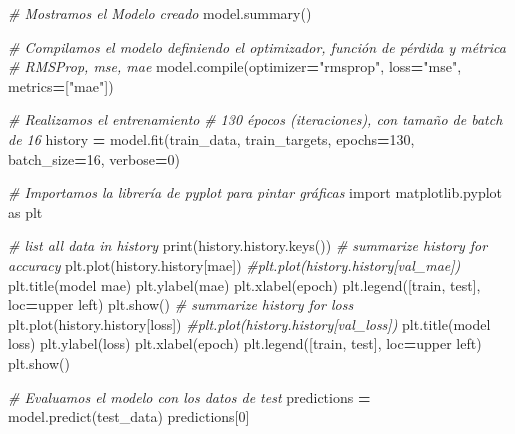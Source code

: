 \documentclass[
  a4paper,
  DIV=11,
  numbers=noendperiod]{scrreprt}
\newenvironment{Shaded}{\begin{snugshade}}{\end{snugshade}}
\newcommand{\BuiltInTok}[1]{#1}
\newcommand{\CommentTok}[1]{\textcolor[rgb]{0.56,0.35,0.01}{\textit{#1}}}
\newcommand{\DecValTok}[1]{\textcolor[rgb]{0.00,0.00,0.81}{#1}}
\newcommand{\ImportTok}[1]{#1}
\newcommand{\NormalTok}[1]{#1}
\newcommand{\OperatorTok}[1]{\textcolor[rgb]{0.81,0.36,0.00}{\textbf{#1}}}
\newcommand{\StringTok}[1]{\textcolor[rgb]{0.31,0.60,0.02}{#1}}
\begin{document}
\begin{Shaded}
\begin{Highlighting}[numbers=left,,]
\CommentTok{\# Mostramos el Modelo creado}
\NormalTok{model.summary()}

\CommentTok{\# Compilamos el modelo definiendo el optimizador, función de pérdida y métrica}
\CommentTok{\# RMSProp, mse, mae}
\NormalTok{model.}\BuiltInTok{compile}\NormalTok{(optimizer}\OperatorTok{=}\StringTok{"rmsprop"}\NormalTok{, loss}\OperatorTok{=}\StringTok{"mse"}\NormalTok{, metrics}\OperatorTok{=}\NormalTok{[}\StringTok{"mae"}\NormalTok{])}



\CommentTok{\# Realizamos el entrenamiento}
\CommentTok{\# 130 épocos (iteraciones), con tamaño de batch de 16}
\NormalTok{history }\OperatorTok{=}\NormalTok{ model.fit(train\_data, train\_targets,}
\NormalTok{          epochs}\OperatorTok{=}\DecValTok{130}\NormalTok{, batch\_size}\OperatorTok{=}\DecValTok{16}\NormalTok{, verbose}\OperatorTok{=}\DecValTok{0}\NormalTok{)}


\CommentTok{\# Importamos la librería de pyplot para pintar gráficas}
\ImportTok{import}\NormalTok{ matplotlib.pyplot }\ImportTok{as}\NormalTok{ plt}

\CommentTok{\# list all data in history}
\BuiltInTok{print}\NormalTok{(history.history.keys())}
\CommentTok{\# summarize history for accuracy}
\NormalTok{plt.plot(history.history[}\StringTok{\textquotesingle{}mae\textquotesingle{}}\NormalTok{])}
\CommentTok{\#plt.plot(history.history[\textquotesingle{}val\_mae\textquotesingle{}])}
\NormalTok{plt.title(}\StringTok{\textquotesingle{}model mae\textquotesingle{}}\NormalTok{)}
\NormalTok{plt.ylabel(}\StringTok{\textquotesingle{}mae\textquotesingle{}}\NormalTok{)}
\NormalTok{plt.xlabel(}\StringTok{\textquotesingle{}epoch\textquotesingle{}}\NormalTok{)}
\NormalTok{plt.legend([}\StringTok{\textquotesingle{}train\textquotesingle{}}\NormalTok{, }\StringTok{\textquotesingle{}test\textquotesingle{}}\NormalTok{], loc}\OperatorTok{=}\StringTok{\textquotesingle{}upper left\textquotesingle{}}\NormalTok{)}
\NormalTok{plt.show()}
\CommentTok{\# summarize history for loss}
\NormalTok{plt.plot(history.history[}\StringTok{\textquotesingle{}loss\textquotesingle{}}\NormalTok{])}
\CommentTok{\#plt.plot(history.history[\textquotesingle{}val\_loss\textquotesingle{}])}
\NormalTok{plt.title(}\StringTok{\textquotesingle{}model loss\textquotesingle{}}\NormalTok{)}
\NormalTok{plt.ylabel(}\StringTok{\textquotesingle{}loss\textquotesingle{}}\NormalTok{)}
\NormalTok{plt.xlabel(}\StringTok{\textquotesingle{}epoch\textquotesingle{}}\NormalTok{)}
\NormalTok{plt.legend([}\StringTok{\textquotesingle{}train\textquotesingle{}}\NormalTok{, }\StringTok{\textquotesingle{}test\textquotesingle{}}\NormalTok{], loc}\OperatorTok{=}\StringTok{\textquotesingle{}upper left\textquotesingle{}}\NormalTok{)}
\NormalTok{plt.show()}


\CommentTok{\# Evaluamos el modelo con los datos de test}
\NormalTok{predictions }\OperatorTok{=}\NormalTok{ model.predict(test\_data)}
\NormalTok{predictions[}\DecValTok{0}\NormalTok{]}
\end{Highlighting}
\end{Shaded}
\end{document}
